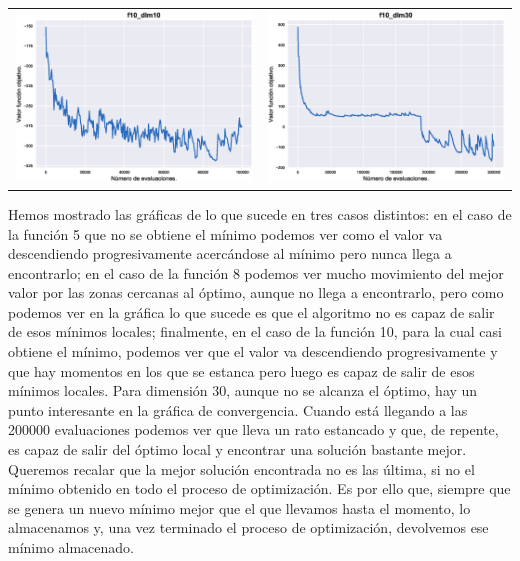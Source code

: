 \documentclass[12pt]{article}
\numberwithin{figure}{section} %
\numberwithin{table}{section} %
\begin{document}
	\begin{table}[H]
	\centering
	\begin{tabular}{ll}
	\includegraphics[width=0.5\linewidth]{./images/f10_dim10.eps} & \includegraphics[width=0.5\linewidth]{./images/f10_dim30.eps} \\
	\end{tabular}
	\end{table}
	
	Hemos mostrado las gráficas de lo que sucede en tres casos distintos: en el caso de la función 5 que no se obtiene el mínimo podemos ver como el valor va descendiendo progresivamente acercándose al mínimo pero nunca llega a encontrarlo; en el caso de la función 8 podemos ver mucho movimiento del mejor valor por las zonas cercanas al óptimo, aunque no llega a encontrarlo, pero como podemos ver en la gráfica lo que sucede es que el algoritmo no es capaz de salir de esos mínimos locales; finalmente, en el caso de la función 10, para la cual casi obtiene el mínimo, podemos ver que el valor va descendiendo progresivamente y que hay momentos en los que se estanca pero luego es capaz de salir de esos mínimos locales. Para dimensión 30, aunque no se alcanza el óptimo, hay un punto interesante en la gráfica de convergencia. Cuando está llegando a las 200000 evaluaciones podemos ver que lleva un rato estancado y que, de repente, es capaz de salir del óptimo local y encontrar una solución bastante mejor. \\
	
	Queremos recalar que la mejor solución encontrada no es las última, si no el mínimo obtenido en todo el proceso de optimización. Es por ello que, siempre que se genera un nuevo mínimo mejor que el que llevamos hasta el momento, lo almacenamos y, una vez terminado el proceso de optimización, devolvemos ese mínimo almacenado.
	
\end{document}

